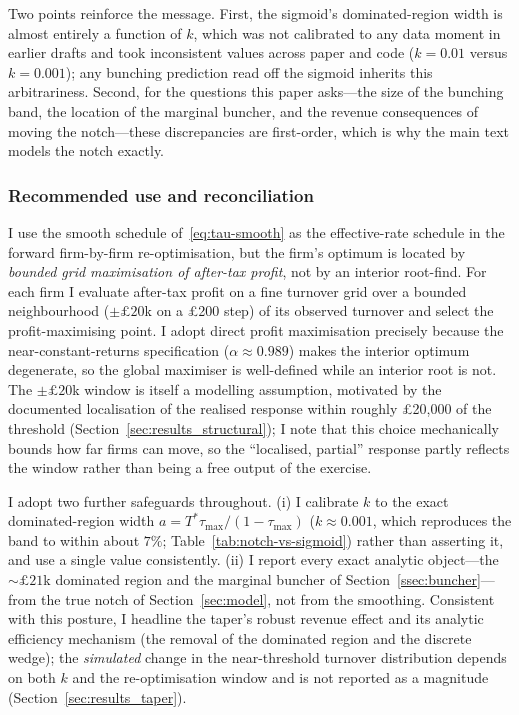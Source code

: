 Two points reinforce the message. First, the sigmoid's dominated-region width is
almost entirely a function of $k$, which was not calibrated to any data moment in
earlier drafts and took inconsistent values across paper and code ($k=0.01$
versus $k=0.001$); any bunching prediction read off the sigmoid inherits this
arbitrariness. Second, for the questions this paper asks---the size of the
bunching band, the location of the marginal buncher, and the revenue
consequences of moving the notch---these discrepancies are first-order, which is
why the main text models the notch exactly.

\subsubsection*{Recommended use and reconciliation}

I use the smooth schedule of~\eqref{eq:tau-smooth} as the effective-rate
schedule in the forward firm-by-firm re-optimisation, but the firm's optimum is
located by \emph{bounded grid maximisation of after-tax profit}, not by an
interior root-find. For each firm I evaluate after-tax profit on a fine turnover
grid over a bounded neighbourhood ($\pm\pounds20$k on a \pounds200 step) of its
observed turnover and select the profit-maximising point. I adopt direct profit
maximisation precisely because the near-constant-returns specification
($\alpha\approx0.989$) makes the interior optimum degenerate, so the global
maximiser is well-defined while an interior root is not. The
$\pm\pounds20$k window is itself a modelling assumption, motivated by the
documented localisation of the realised response within roughly \pounds20{,}000
of the threshold (Section~\ref{sec:results_structural}); I note that this choice
mechanically bounds how far firms can move, so the ``localised, partial'' response
partly reflects the window rather than being a free output of the exercise.

I adopt two further safeguards throughout. (i) I calibrate $k$ to the exact
dominated-region width $a=T^{*}\tau_{\max}/(1-\tau_{\max})$ ($k\approx0.001$,
which reproduces the band to within about $7\%$;
Table~\ref{tab:notch-vs-sigmoid}) rather than asserting it, and use a single value
consistently. (ii) I report every exact analytic object---the
$\sim\pounds21$k dominated region and the marginal buncher of
Section~\ref{ssec:buncher}---from the true notch of Section~\ref{sec:model}, not
from the smoothing. Consistent with this posture, I headline the taper's robust
revenue effect and its analytic efficiency mechanism (the removal of the dominated
region and the discrete wedge); the \emph{simulated} change in the near-threshold
turnover distribution depends on both $k$ and the re-optimisation window and is
not reported as a magnitude (Section~\ref{sec:results_taper}).
